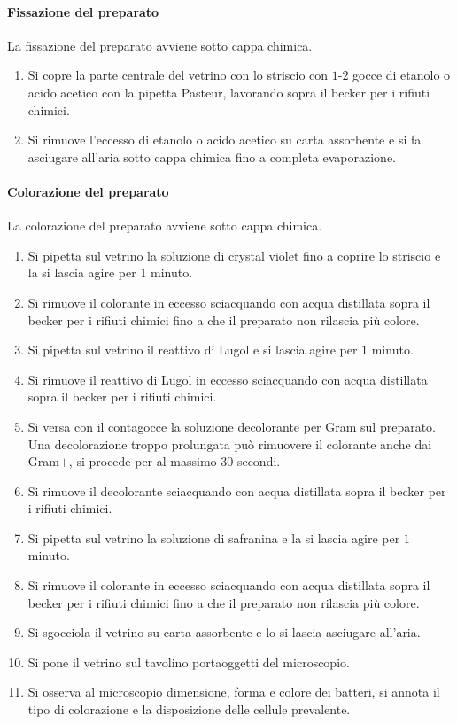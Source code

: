 			\paragraph{Fissazione del preparato}
			La fissazione del preparato avviene sotto cappa chimica.
			\begin{enumerate}
				\item Si copre la parte centrale del vetrino con lo striscio con $1$-$2$ gocce di etanolo o acido acetico con la pipetta Pasteur, lavorando sopra il becker per i rifiuti chimici.
				\item Si rimuove l'eccesso di etanolo o acido acetico su carta assorbente e si fa asciugare all'aria sotto cappa chimica fino a completa evaporazione.
			\end{enumerate}

			\paragraph{Colorazione del preparato}
			La colorazione del preparato avviene sotto cappa chimica.
			\begin{enumerate}
				\item Si pipetta sul vetrino la soluzione di crystal violet fino a coprire lo striscio e la si lascia agire per $1$ minuto.
				\item Si rimuove il colorante in eccesso sciacquando con acqua distillata sopra il becker per i rifiuti chimici fino a che il preparato non rilascia pi\`u colore.
				\item Si pipetta sul vetrino il reattivo di Lugol e si lascia agire per $1$ minuto.
				\item Si rimuove il reattivo di Lugol in eccesso sciacquando con acqua distillata sopra il becker per i rifiuti chimici.
				\item Si versa con il contagocce la soluzione decolorante per Gram sul preparato.
					Una decolorazione troppo prolungata pu\`o rimuovere il colorante anche dai Gram$+$, si procede per al massimo $30$ secondi.
				\item Si rimuove il decolorante sciacquando con acqua distillata sopra il becker per i rifiuti chimici.
				\item Si pipetta sul vetrino la soluzione di safranina e la si lascia agire per $1$ minuto.
				\item Si rimuove il colorante in eccesso sciacquando con acqua distillata sopra il becker per i rifiuti chimici fino a che il preparato non rilascia pi\`u colore.
				\item Si sgocciola il vetrino su carta assorbente e lo si lascia asciugare all'aria.
				\item Si pone il vetrino sul tavolino portaoggetti del microscopio.
				\item Si osserva al microscopio dimensione, forma e colore dei batteri, si annota il tipo di colorazione e la disposizione delle cellule prevalente.
			\end{enumerate}


